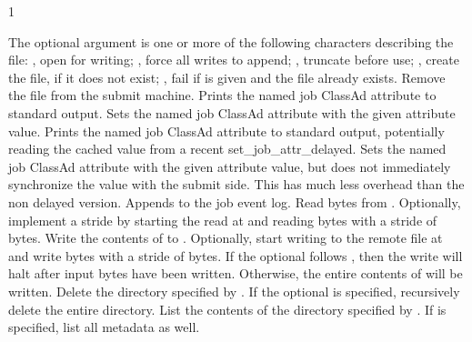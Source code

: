 \begin{ManPage}{\label{man-condor-chirp}}{1}
\begin{description}
{    The optional  argument is one or more of 
    the following characters describing the  file:
      ,  open for writing;
      ,  force all writes to append;
      ,  truncate before use;
      ,  create the file, if it does not exist;
      ,  fail if  is given and the file already exists.
    }
    {Remove the  file from the submit machine.}
    {Prints the named job ClassAd attribute to standard output.}
    {Sets the named job ClassAd attribute with the given attribute value.}
    {Prints the named job ClassAd attribute to standard output, 
    potentially reading the cached value from a recent set\_job\_attr\_delayed.}
    {Sets the named job ClassAd attribute with the given attribute value, 
    but does not immediately synchronize the value with the submit side. 
    This has much less overhead than the non delayed version.}
    {Appends  to the job event log.}
    {Read  bytes from . Optionally,
    implement a stride by
    starting the read at  and reading  bytes
    with a stride of  bytes.}
    {Write the contents of  to .
    Optionally, start writing to the remote file at  and write
     bytes with a stride of  bytes.  If the optional
     follows , then the
    write will halt after  input bytes have been written.
    Otherwise, the entire contents of  will be written.}
    {Delete the directory specified by . 
    If the optional  is specified, 
    recursively delete the entire directory.}
    {List the contents of the directory specified by . 
    If  is specified, list all metadata as well.}

\end{description}
\end{ManPage}
